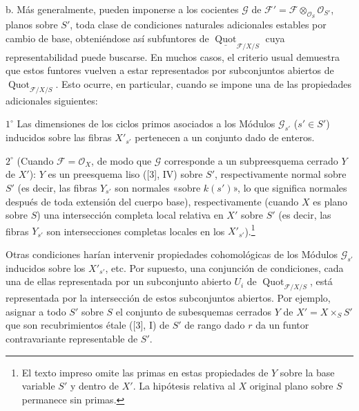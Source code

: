 \medskip
\noindent b. Más generalmente, pueden imponerse a los cocientes $\mathcal G$
de $\mathcal F'=\mathcal F\otimes_{\mathcal O_S}\mathcal O_{S'}$, planos
sobre $S'$, toda clase de condiciones naturales adicionales estables por
cambio de base, obteniéndose así subfuntores de
$\underline{\operatorname{Quot}}_{\mathcal F/X/S}$ cuya representabilidad
puede buscarse. En muchos casos, el criterio usual demuestra que estos
funtores vuelven a estar representados por subconjuntos abiertos de
$\operatorname{Quot}_{\mathcal F/X/S}$. Esto ocurre, en particular, cuando se
impone una de las propiedades adicionales siguientes:

\smallskip
\noindent $1^\circ$ Las dimensiones de los ciclos primos asociados a los
Módulos $\mathcal G_{s'}$ ($s'\in S'$) inducidos sobre las fibras $X'_{s'}$
pertenecen a un conjunto dado de enteros.

\smallskip
\noindent $2^\circ$ (Cuando $\mathcal F=\mathcal O_X$, de modo que
$\mathcal G$ corresponde a un subpreesquema cerrado $Y$ de $X'$): $Y$ es un
preesquema liso ([3], IV) sobre $S'$, respectivamente normal sobre $S'$ (es
decir, las fibras $Y_{s'}$ son normales «sobre $k(s')$», lo que significa
normales después de toda extensión del cuerpo base), respectivamente (cuando
$X$ es plano sobre $S$) una intersección completa local relativa en $X'$ sobre
$S'$ (es decir, las fibras $Y_{s'}$ son intersecciones completas locales en los
$X'_{s'}$).\footnote{El texto impreso omite las primas en estas propiedades de $Y$ sobre la base variable $S'$ y dentro de $X'$. La hipótesis relativa al $X$ original plano sobre $S$ permanece sin primas.}

Otras condiciones harían intervenir propiedades cohomológicas de los Módulos
$\mathcal G_{s'}$ inducidos sobre los $X'_{s'}$, etc. Por supuesto, una
conjunción de condiciones, cada una de ellas representada por un subconjunto
abierto $U_i$ de $\operatorname{Quot}_{\mathcal F/X/S}$, está representada por
la intersección de estos subconjuntos abiertos. Por ejemplo, asignar a todo
$S'$ sobre $S$ el conjunto de subesquemas cerrados $Y$ de
$X'=X\times_SS'$ que son recubrimientos étale ([3], I) de $S'$ de rango dado
$r$ da un funtor contravariante representable de $S'$.

